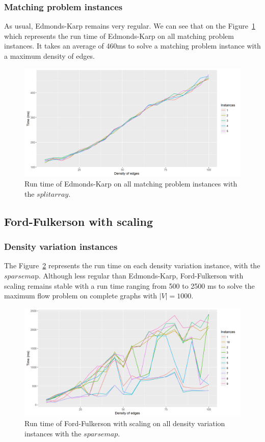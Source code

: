 \subsubsection{Matching problem instances}
As usual, Edmonds-Karp remains very regular. We can see that on the Figure~\ref{fig:ekmatching} which represents the run time of Edmonds-Karp on all matching problem instances. It takes an average of 460ms to solve a matching problem instance with a maximum density of edges.
\begin{figure}[H]
\begin{center}
\includegraphics[scale=0.55]{images/results/ekmatching.png}
\caption{Run time of Edmonds-Karp on all matching problem instances with the $split array$.}
\label{fig:ekmatching}
\end{center}
\end{figure}


\subsection{Ford-Fulkerson with scaling}
\subsubsection{Density variation instances}
The Figure~\ref{fig:FFmean} represents the run time on each density variation instance, with the $sparsema$p. Although less regular than Edmonds-Karp, Ford-Fulkerson with scaling remains stable with a run time ranging from 500 to 2500 ms to solve the maximum flow problem on complete graphs with $|V|=1000$.
\begin{figure}[H]
\begin{center}
\includegraphics[scale=0.5]{images/results/FFmean.png}
\caption{Run time of Ford-Fulkerson with scaling on all density variation instances with the $sparse map$.}
\label{fig:FFmean}
\end{center}
\end{figure}

